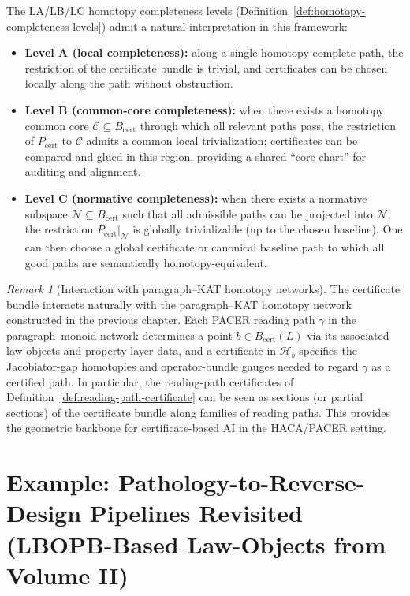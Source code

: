 \documentclass[11pt]{book}
\theoremstyle{plain}
\theoremstyle{definition}
\theoremstyle{remark}
\newtheorem{remark}[theorem]{Remark}
\begin{document}
The LA/LB/LC homotopy completeness levels
(Definition~\ref{def:homotopy-completeness-levels}) admit a natural
interpretation in this framework:
\begin{itemize}
  \item \textbf{Level A (local completeness):} along a single
        homotopy-complete path, the restriction of the certificate
        bundle is trivial, and certificates can be chosen locally
        along the path without obstruction.
  \item \textbf{Level B (common-core completeness):} when there exists
        a homotopy common core $\mathcal{C}\subseteq B_{\mathrm{cert}}$
        through which all relevant paths pass, the restriction of
        $P_{\mathrm{cert}}$ to $\mathcal{C}$ admits a common local
        trivialization; certificates can be compared and glued in this
        region, providing a shared ``core chart'' for auditing and
        alignment.
  \item \textbf{Level C (normative completeness):} when there exists a
        normative subspace $\mathcal{N}\subseteq B_{\mathrm{cert}}$
        such that all admissible paths can be projected into
        $\mathcal{N}$, the restriction $P_{\mathrm{cert}}|_{\mathcal{N}}$
        is globally trivializable (up to the chosen baseline). One can
        then choose a global certificate or canonical baseline path
        to which all good paths are semantically homotopy-equivalent.
\end{itemize}

\begin{remark}[Interaction with paragraph--KAT homotopy networks]
\label{rem:certificate-bundle-homotopy-network}
The certificate bundle interacts naturally with the paragraph--KAT
homotopy network constructed in the previous chapter. Each PACER
reading path $\gamma$ in the paragraph–monoid network determines a
point $b\in B_{\mathrm{cert}}(L)$ via its associated law-objects and
property-layer data, and a certificate in $\mathcal{H}_b$ specifies
the Jacobiator-gap homotopies and operator-bundle gauges needed to
regard $\gamma$ as a certified path. In particular, the
reading-path certificates of
Definition~\ref{def:reading-path-certificate} can be seen as sections
(or partial sections) of the certificate bundle along families of
reading paths. This provides the geometric backbone for
certificate-based AI in the HACA/PACER setting.
\end{remark}



\section[Example: Pathology-to-Reverse-Design Pipelines Revisited]{Example: Pathology-to-Reverse-Design Pipelines Revisited\\
         (LBOPB-Based Law-Objects from Volume II)}
\end{document}
